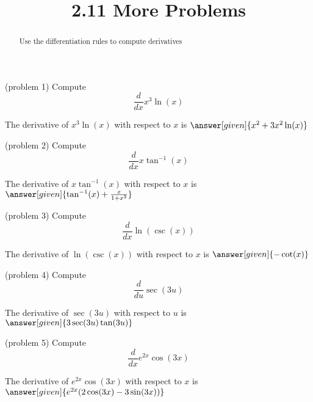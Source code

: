 \documentclass{ximera}
\title{2.11 More Problems}
\begin{document}
\begin{abstract}
Use the differentiation rules to compute derivatives
\end{abstract}

\maketitle








\begin{problem}(problem 1)
  Compute
  \[
  \frac{d}{dx}x^3\ln(x)
  \]
  
    
    
		The derivative of $x^3\ln (x)$ with respect to $x$ is
		 $\answer[given]{x^2 + 3x^2\ln(x)}$
		
\end{problem}





\begin{problem}(problem 2)
  Compute
  \[
  \frac{d}{dx} x \tan^{-1} (x)
  \]
  
    
    
		The derivative of $x \tan^{-1} (x)$ with respect to $x$ is
		 $\answer[given]{\tan^{-1}(x) + \frac{x}{1+x^2}}$
		
\end{problem}



\begin{problem}(problem 3)
  Compute
  \[
  \frac{d}{dx} \ln(\csc (x))
  \]
  
    
    
		The derivative of $\ln(\csc (x))$ with respect to $x$ is
		 $\answer[given]{-\cot(x)}$
		
\end{problem}



\begin{problem}(problem 4)
  Compute
  \[
  \frac{d}{du} \sec(3u)
  \]
  
    
    
		The derivative of $\sec(3u)$ with respect to $u$ is
		 $\answer[given]{3\sec(3u)\tan(3u)}$
		
\end{problem}


\begin{problem}(problem 5)
  Compute
  \[
  \frac{d}{dx} e^{2x} \cos(3x)
  \]
  
   
    
		The derivative of $e^{2x} \cos(3x)$ with respect to $x$ is
		 $\answer[given]{e^{2x}(2\cos(3x)-3\sin(3x))}$
		
\end{problem}
\end{document}

